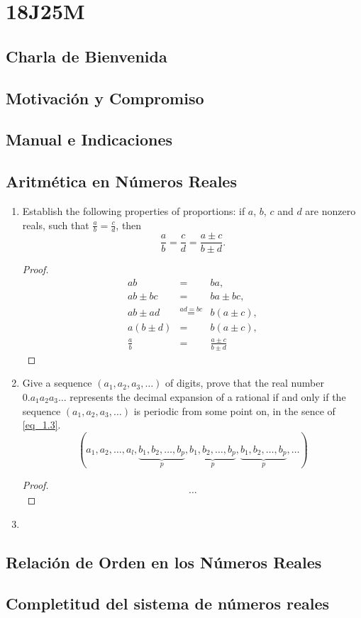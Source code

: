 \chapter{18J25M}
\section{Charla de Bienvenida}

\section{Motivaci\'{o}n y Compromiso}

\section{Manual e Indicaciones}

\section{Aritm\'{e}tica en N\'{u}meros Reales}
\begin{enumerate}
  \item Establish the following properties of proportions: if $a$, $b$, $c$ and $d$ are nonzero reals, such that $\frac{a}{b}= \frac{c}{d}$, then
  \begin{equation*}
    \frac{a}{b}= \frac{c}{d}= \frac{a\pm c}{b\pm d}.
  \end{equation*}
  \begin{proof}
    \begin{eqnarray*}
      ab&=& ba,\\
      ab\pm bc &=& ba\pm bc,\\
      ab\pm ad&\overset{ad= bc}{=}& b(a\pm c),\\
      a(b\pm d)&=& b(a\pm c),\\
      \frac{a}{b}&=& \frac{a\pm c}{b\pm d}
    \end{eqnarray*}
  \end{proof}
  
  \item Give a sequence $(a_{1}, a_{2}, a_{3}, \dots)$ of digits, prove that the real number $0.a_{1}a_{2}a_{3}\dots$ represents the decimal expansion of a rational if and only if the sequence $(a_{1}, a_{2}, a_{3}, \dots)$ is periodic from some point on, in the sence of \ref{eq_1.3}.
  \begin{equation}\label{eq_1.3}
    (a_{1}, a_{2}, \dots, a_{l}, \underbrace{b_{1}, b_{2}, \dots, b_{p}}_{p}, \underbrace{b_{1}, b_{2}, \dots, b_{p}}_{p}, \underbrace{b_{1}, b_{2}, \dots, b_{p}}_{p}, \dots)
  \end{equation}
  \begin{proof}
  $$\dots$$
  \hline
  \end{proof}
  
  \item
\end{enumerate}

\section{Relaci\'{o}n de Orden en los N\'{u}meros Reales}

\section{Completitud del sistema de n\'{u}meros reales}
